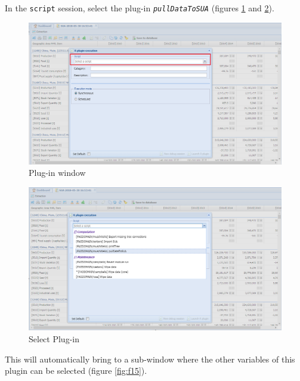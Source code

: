 \documentclass[]{article}
\begin{document}
In the \texttt{script} session, select the plug-in
\emph{\texttt{pullDataToSUA}} (figures \ref{fig:f13} and \ref{fig:f14}).

\begin{figure}[H]

{\centering \includegraphics[width=1\linewidth]{images/pullData/13_pluginWindow} 

}

\caption{\label{fig:f13}Plug-in window}\label{fig:f13}
\end{figure}

\begin{figure}[H]

{\centering \includegraphics[width=1\linewidth]{images/pullData/14_selectPlugin} 

}

\caption{\label{fig:f14}Select Plug-in}\label{fig:f14}
\end{figure}

This will automatically bring to a sub-window where the other variables
of this plugin can be selected (figure \ref{fig:f15}).
\end{document}
